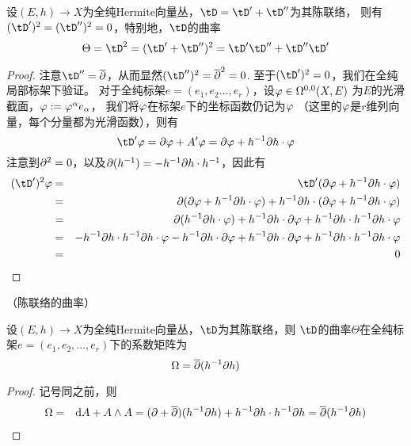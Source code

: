 \begin{lemma}
设$(E,h)\to X$为全纯Hermite向量丛，$\tD=\tD'+\tD''$为其陈联络，
则有$(\tD')^2=(\tD'')^2=0$，特别地，$\tD$的曲率
$$\Theta=\tD^2=(\tD'+\tD'')^2=\tD'\tD''+\tD''\tD'$$
\end{lemma}

\begin{proof}
注意$\tD''=\pbar$，从而显然$(\tD'')^2=\pbar^2=0$.
至于$(\tD')^2=0$，我们在全纯局部标架下验证。
对于全纯标架$e=(e_1,e_2...,e_r)$，设$\varphi\in\Omega^{0,0}(X,E)$
为$E$的光滑截面，$\varphi:=\varphi^\alpha e_\alpha$，
我们将$\varphi$在标架$e$下的坐标函数仍记为$\varphi$
（这里的$\varphi$是$r$维列向量，每个分量都为光滑函数），则有
$$\tD'\fai=\p\fai+A'\fai=\p\fai+h^{-1}\p h\cdot \fai$$
注意到$\partial^2=0$，以及$\partial(h^{-1})=-h^{-1}\partial h\cdot h^{-1}$，因此有
\begin{eqnarray*}
     (\tD')^2\fai
&=&
     \tD'(\p\fai+h^{-1}\p h\cdot\fai)\\
&=&
     \p(\p\fai+h^{-1}\p h\cdot\fai)
    +h^{-1}\p h\cdot(\p\fai+h^{-1}\p h\cdot\fai)\\
&=&
     \p(h^{-1}\p h\cdot \fai)
    +h^{-1}\p h\cdot\p\fai
    +h^{-1}\p h\cdot h^{-1}\p h\cdot\fai\\
&=&
    -h^{-1}\p h\cdot h^{-1}\p h\cdot\fai
    -h^{-1}\p h\cdot\p\fai
    +h^{-1}\p h\cdot\p\fai
    +h^{-1}\p h\cdot h^{-1}\p h\cdot\fai\\
&=&
     0
\end{eqnarray*}
\end{proof}

\begin{prop}（陈联络的曲率）

设$(E,h)\to X$为全纯Hermite向量丛，$\tD$为其陈联络，则
$\tD$的曲率$\Theta$在全纯标架$e=(e_1,e_2,...,e_r)$下的系数矩阵为
$$
  \Omega=\overline{\partial}(h^{-1}\partial h)
$$
\end{prop}

\begin{proof}
记号同之前，则
\begin{eqnarray*}
     \Omega&=&\mathrm{d} A+A\wedge A
 =
     (\partial+\overline{\partial})(h^{-1}\partial h)+h^{-1}\partial h\cdot h^{-1}\partial h
 =
     \overline{\partial}(h^{-1}\partial h)
\end{eqnarray*}
\end{proof}

